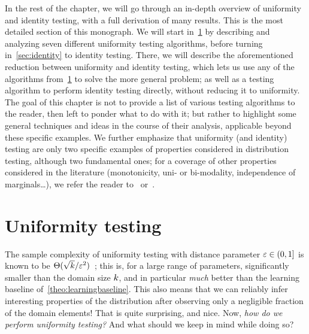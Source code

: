 In the rest of the chapter, we will go through an in-depth overview of uniformity and identity testing, with a full derivation of many results. This is the most detailed section of this monograph. We will start in~\cref{sec:uniformity} by describing and analyzing seven different uniformity testing algorithms, before turning in~\cref{sec:identity} to identity testing. There, we will describe the aforementioned reduction between uniformity and identity testing, which lets us use any of the algorithms from~\cref{sec:uniformity} to solve the more general problem; as well as a testing algorithm to perform identity testing directly, without reducing it to uniformity. The goal of this chapter is not to provide a list of various testing algorithms to the reader, then left to ponder what to do with it; but rather to highlight some general techniques and ideas in the course of their analysis, applicable beyond these specific examples. We further emphasize that uniformity (and identity) testing are only two specific examples of properties considered in distribution testing, although two fundamental ones; for a coverage of other properties considered in the literature (\eg monotonicity, uni- or bi-modality, independence of marginals\dots), we refer the reader to~\citet{Canonne:15:Survey} or~\citet[Chapter~11]{Goldreich:17}.


\section{Uniformity testing}
  \label{sec:uniformity}

The sample complexity of uniformity testing with distance parameter $\varepsilon\in(0,1]$ is known to be $\Theta(\sqrt{k}/\varepsilon^2)$~\citep{Paninski08}; this is, for a large range of parameters, significantly smaller than the domain size $k$, and in particular \emph{much} better than the learning baseline of~\cref{theo:learningbaseline}. This also means that we can reliably infer interesting properties of the distribution after observing only a negligible fraction of the domain elements! That is quite surprising, and nice. Now, \emph{how do we perform uniformity testing?}  And what should we keep in mind while doing so?


